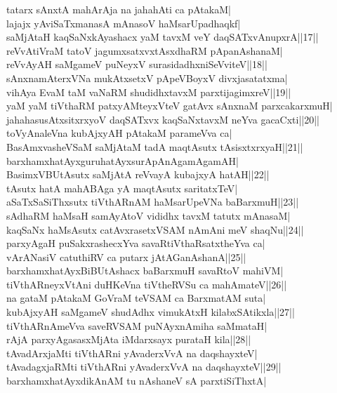 \documentclass{article}
\begin{document}
tatarx sAnxtA mahArAja na jahahAti ca pAtakaM|\\
lajajx yAviSaTxmanasA mAnasoV haMsarUpadhaqkf|\\
saMjAtaH kaqSaNxkAyashacx yaM tavxM veY daqSATxvAnupxrA||17||\\
reVvAtiVraM tatoV jagumxsatxvxtAsxdhaRM pApanAshanaM|\\
reVvAyAH saMgameV puNeyxV surasidadhxniSeVviteV||18||\\
sAnxnamAterxVNa mukAtxsetxV pApeVBoyxV divxjasatatxma|\\
vihAya EvaM taM vaNaRM shudidhxtavxM parxtijagimxreV||19||\\
yaM yaM tiVthaRM patxyAMteyxVteV gatAvx sAnxnaM parxcakarxmuH|\\
jahahasusAtxsitxrxyoV daqSATxvx kaqSaNxtavxM neYva gacaCxti||20||\\
toVyAnaleVna kubAjxyAH pAtakaM parameVva ca|\\
BasAmxvasheVSaM saMjAtaM tadA maqtAsutx tAsisxtxrxyaH||21||\\
barxhamxhatAyxguruhatAyxsurApAnAgamAgamAH|\\
BasimxVBUtAsutx saMjAtA reVvayA kubajxyA hatAH||22||\\
tAsutx hatA mahABAga yA maqtAsutx saritatxTeV|\\
aSaTxSaSiThxsutx tiVthARnAM haMsarUpeVNa baBarxmuH||23||\\
sAdhaRM haMsaH samAyAtoV vididhx tavxM tatutx mAnasaM|\\
kaqSaNx haMsAsutx catAvxrasetxVSAM nAmAni meV shaqNu||24||\\
parxyAgaH puSakxrashecxYva savaRtiVthaRsatxtheYva ca|\\
vArANasiV catuthiRV ca putarx jAtAGanAshanA||25||\\
barxhamxhatAyxBiBUtAshacx baBarxmuH savaRtoV mahiVM|\\
tiVthARneyxVtAni duHKeVna tiVtheRVSu ca mahAmateV||26||\\
na gataM pAtakaM GoVraM teVSAM ca BarxmatAM suta|\\
kubAjxyAH saMgameV shudAdhx vimukAtxH kilabxSAtikxla||27||\\
tiVthARnAmeVva saveRVSAM puNAyxnAmiha saMmataH|\\
rAjA parxyAgasasxMjAta iMdarxsayx purataH kila||28||\\
tAvadArxjaMti tiVthARni yAvaderxVvA na daqshayxteV|\\
tAvadagxjaRMti tiVthARni yAvaderxVvA na daqshayxteV||29||\\
barxhamxhatAyxdikAnAM tu nAshaneV sA parxtiSiThxtA|\\
\end{document}
